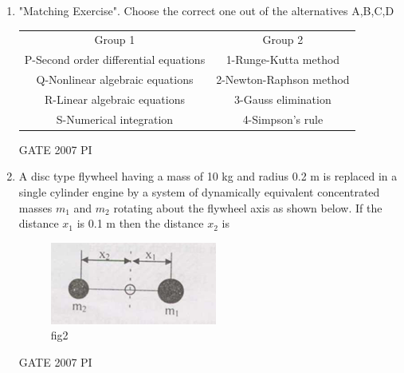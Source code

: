 \documentclass[journal,12pt,onecolumn]{IEEEtran}
\theoremstyle{remark}
\begin{document}
\begin{enumerate}
    \item 
    "Matching Exercise". Choose the correct one out of the alternatives A,B,C,D
   
        \begin{tabular}{c|c}
        Group 1     &  Group 2\\
      P-Second order differential equations       & 1-Runge-Kutta method\\
      Q-Nonlinear algebraic equations & 2-Newton-Raphson method\\
      R-Linear algebraic equations & 3-Gauss elimination\\
      S-Numerical integration & 4-Simpson's rule
      
        \end{tabular}
        \hfill{GATE 2007 PI}
        \begin{enumerate}
        \end{enumerate}
        
       \item 
        	A disc type flywheel having a mass of 10 kg and radius 0.2 m is replaced in a single cylinder engine by a system of dynamically equivalent concentrated masses $m_{1}$ and $m_{2}$ rotating about the flywheel axis as shown below. If the distance $x_{1}$ is 0.1 m then the distance $x_{2}$ is
            
             
                  \begin{figure}[H]
                      \centering
                      \includegraphics[width=0.3\linewidth]{figs/Q.28.png}
                      \caption{fig2}
                      \label{fig:figs/Q.28.png}
                  \end{figure}
                  
                \hfill{GATE 2007 PI}
                \begin{enumerate}
                    \end{enumerate}
                    

\end{enumerate}
\end{document}
